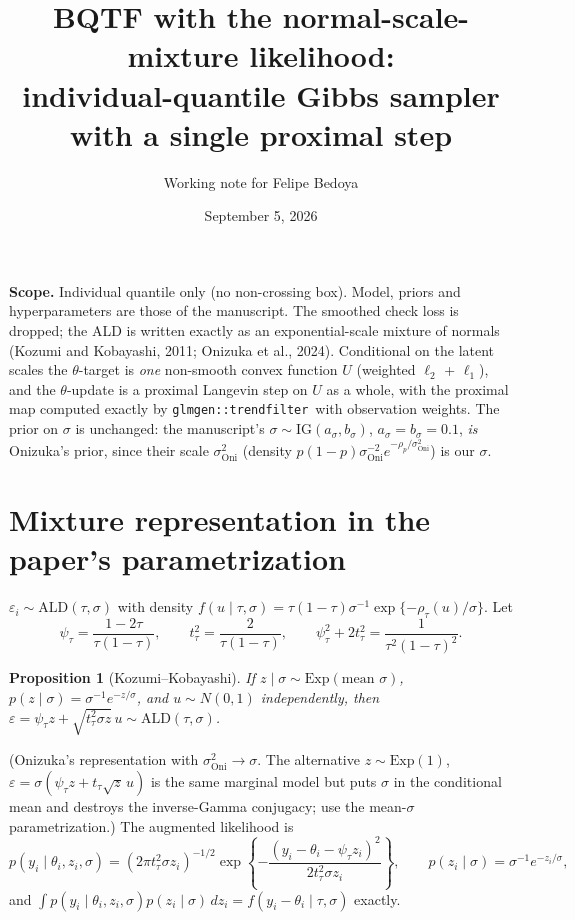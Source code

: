 \documentclass[12pt]{article}
\title{BQTF with the normal-scale-mixture likelihood:\\ individual-quantile Gibbs sampler with a single proximal step}
\author{Working note for Felipe Bedoya}
\date{September 5, 2026}
\newcommand{\IG}{\mathrm{IG}}
\newcommand{\Exp}{\mathrm{Exp}}
\newcommand{\tf}{\texttt{trendfilter}}
\newtheorem{proposition}{Proposition}
\begin{document}
\maketitle

\noindent\textbf{Scope.} Individual quantile only (no non-crossing box). Model, priors and
hyperparameters are those of the manuscript. The smoothed check loss is dropped; the ALD is
written exactly as an exponential-scale mixture of normals (Kozumi and Kobayashi, 2011; Onizuka
et al., 2024). Conditional on the latent scales the $\theta$-target is
\emph{one} non-smooth convex function $U$ (weighted $\ell_2$ + $\ell_1$), and the $\theta$-update is a
proximal Langevin step on $U$ as a whole, with the proximal map computed exactly by
\texttt{glmgen::}\tf\ with observation weights. The prior on $\sigma$ is unchanged: the manuscript's
$\sigma\sim\IG(a_\sigma,b_\sigma)$, $a_\sigma=b_\sigma=0.1$, \emph{is} Onizuka's prior, since their scale
$\sigma^2_{\mathrm{Oni}}$ (density $p(1-p)\sigma^{-2}_{\mathrm{Oni}}e^{-\rho_p/\sigma^2_{\mathrm{Oni}}}$) is our $\sigma$.

\section{Mixture representation in the paper's parametrization}

$\varepsilon_i\sim\mathrm{ALD}(\tau,\sigma)$ with density
$f(u\mid\tau,\sigma)=\tau(1-\tau)\sigma^{-1}\exp\{-\rho_\tau(u)/\sigma\}$. Let
\begin{equation}
    \psi_\tau=\frac{1-2\tau}{\tau(1-\tau)},\qquad
    t_\tau^2=\frac{2}{\tau(1-\tau)},\qquad
    \psi_\tau^2+2t_\tau^2=\frac{1}{\tau^2(1-\tau)^2}.
    \label{eq:constants}
\end{equation}
\begin{proposition}[Kozumi--Kobayashi]
If $z\mid\sigma\sim\Exp(\text{mean }\sigma)$, $p(z\mid\sigma)=\sigma^{-1}e^{-z/\sigma}$, and
$u\sim N(0,1)$ independently, then
$\varepsilon=\psi_\tau z+\sqrt{t_\tau^2\sigma z}\,u\sim\mathrm{ALD}(\tau,\sigma)$.
\end{proposition}
\noindent(Onizuka's representation with $\sigma^2_{\mathrm{Oni}}\to\sigma$. The alternative
$z\sim\Exp(1)$, $\varepsilon=\sigma(\psi_\tau z+t_\tau\sqrt z\,u)$ is the same marginal model but puts
$\sigma$ in the conditional mean and destroys the inverse-Gamma conjugacy; use the mean-$\sigma$
parametrization.) The augmented likelihood is
\begin{equation}
    p(y_i\mid\theta_i,z_i,\sigma)
    =\left(2\pi t_\tau^2\sigma z_i\right)^{-1/2}
    \exp\!\left\{-\frac{(y_i-\theta_i-\psi_\tau z_i)^2}{2t_\tau^2\sigma z_i}\right\},
    \qquad p(z_i\mid\sigma)=\sigma^{-1}e^{-z_i/\sigma},
    \label{eq:auglik}
\end{equation}
and $\int p(y_i\mid\theta_i,z_i,\sigma)p(z_i\mid\sigma)\,dz_i=f(y_i-\theta_i\mid\tau,\sigma)$ exactly.
\end{document}
